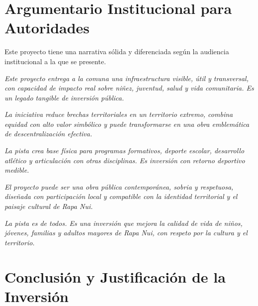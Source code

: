 \documentclass[12pt, a4paper]{article}
\begin{document}
\section{Argumentario Institucional para Autoridades}

Este proyecto tiene una narrativa sólida y diferenciada según la audiencia
institucional a la que se presente.

\begin{description}[leftmargin=3.5cm, style=nextline, itemsep=6pt]

  \item[Municipalidad] \textit{Este proyecto entrega a la comuna una infraestructura
    visible, útil y transversal, con capacidad de impacto real sobre niñez, juventud,
    salud y vida comunitaria. Es un legado tangible de inversión pública.}

  \item[Gob. Regional] \textit{La iniciativa reduce brechas territoriales en un territorio
    extremo, combina equidad con alto valor simbólico y puede transformarse en una
    obra emblemática de descentralización efectiva.}

  \item[IND / Deporte] \textit{La pista crea base física para programas formativos, deporte
    escolar, desarrollo atlético y articulación con otras disciplinas. Es inversión con
    retorno deportivo medible.}

  \item[Patrimonio] \textit{El proyecto puede ser una obra pública contemporánea, sobria
    y respetuosa, diseñada con participación local y compatible con la identidad
    territorial y el paisaje cultural de Rapa Nui.}

  \item[Ciudadanía] \textit{La pista es de todos. Es una inversión que mejora la calidad
    de vida de niños, jóvenes, familias y adultos mayores de Rapa Nui, con respeto
    por la cultura y el territorio.}

\end{description}

\section{Conclusión y Justificación de la Inversión}
\end{document}
